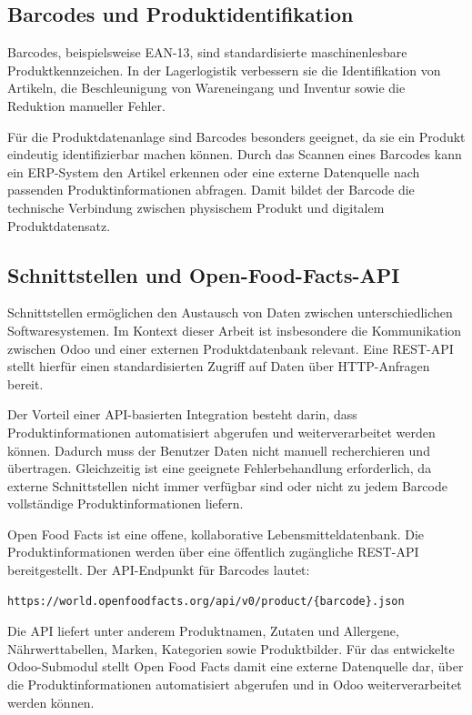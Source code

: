 \documentclass[12pt,a4paper]{article}
\begin{document}
\subsection{Barcodes und Produktidentifikation}

Barcodes, beispielsweise EAN-13, sind standardisierte maschinenlesbare Produktkennzeichen. In der Lagerlogistik verbessern sie die Identifikation von Artikeln, die Beschleunigung von Wareneingang und Inventur sowie die Reduktion manueller Fehler.

Für die Produktdatenanlage sind Barcodes besonders geeignet, da sie ein Produkt eindeutig identifizierbar machen können. Durch das Scannen eines Barcodes kann ein ERP-System den Artikel erkennen oder eine externe Datenquelle nach passenden Produktinformationen abfragen. Damit bildet der Barcode die technische Verbindung zwischen physischem Produkt und digitalem Produktdatensatz.

\subsection{Schnittstellen und Open-Food-Facts-API}

Schnittstellen ermöglichen den Austausch von Daten zwischen unterschiedlichen Softwaresystemen. Im Kontext dieser Arbeit ist insbesondere die Kommunikation zwischen Odoo und einer externen Produktdatenbank relevant. Eine REST-API stellt hierfür einen standardisierten Zugriff auf Daten über HTTP-Anfragen bereit.

Der Vorteil einer API-basierten Integration besteht darin, dass Produktinformationen automatisiert abgerufen und weiterverarbeitet werden können. Dadurch muss der Benutzer Daten nicht manuell recherchieren und übertragen. Gleichzeitig ist eine geeignete Fehlerbehandlung erforderlich, da externe Schnittstellen nicht immer verfügbar sind oder nicht zu jedem Barcode vollständige Produktinformationen liefern.

Open Food Facts ist eine offene, kollaborative Lebensmitteldatenbank. Die Produktinformationen werden über eine öffentlich zugängliche REST-API bereitgestellt. Der API-Endpunkt für Barcodes lautet:

\begin{lstlisting}[caption={API-Endpunkt für Produktabfragen über Barcode}]
https://world.openfoodfacts.org/api/v0/product/{barcode}.json
\end{lstlisting}

Die API liefert unter anderem Produktnamen, Zutaten und Allergene, Nährwerttabellen, Marken, Kategorien sowie Produktbilder. Für das entwickelte Odoo-Submodul stellt Open Food Facts damit eine externe Datenquelle dar, über die Produktinformationen automatisiert abgerufen und in Odoo weiterverarbeitet werden können.
\end{document}
